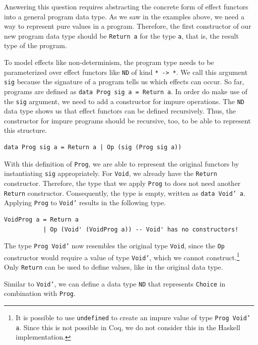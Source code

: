 \documentclass[a4paper, 11pt, fleqn, twoside, abstract=on]{scrreprt}
\newcommand{\hinl}[1]{\texttt{#1}}
\newcommand{\cinl}[1]{\texttt{#1}}
\begin{document}
Answering this question requires abstracting the concrete form of effect functors into a general program data type.
As we saw in the examples above, we need a way to represent pure values in a program.
Therefore, the first constructor of our new program data type should be \hinl{Return a} for the type \hinl{a}, that is, the result type of the program.

To model effects like non-determinism, the program type needs to be parameterized over effect functors like \hinl{ND} of kind \hinl{* -> *}.
We call this argument \hinl{sig} because the signature of a program tells us which effects can occur.
So far, programs are defined as \hinl{data Prog sig a = Return a}.
In order do make use of the \hinl{sig} argument, we need to add a constructor for impure operations.
The \hinl{ND} data type shows us that effect functors can be defined recursively.
Thus, the constructor for impure programs should be recursive, too, to be able to represent this structure.

\begin{verbatim}
data Prog sig a = Return a | Op (sig (Prog sig a))
\end{verbatim}

With this definition of \hinl{Prog}, we are able to represent the original functors by instantiating \hinl{sig} appropriately.
For \hinl{Void}, we already have the \hinl{Return} constructor.
Therefore, the type that we apply \hinl{Prog} to does not need another \hinl{Return} constructor.
Consequently, the type is empty, written as \hinl{data Void' a}.
Applying \cinl{Prog} to \cinl{Void'} results in the following type.

\begin{verbatim}
VoidProg a = Return a
           | Op (Void' (VoidProg a)) -- Void' has no constructors!
\end{verbatim}

The type \hinl{Prog Void'} now resembles the original type \hinl{Void}, since the \hinl{Op} constructor would require a value of type \hinl{Void'}, which we cannot construct.\footnote{It is possible to use \texttt{undefined} to create an impure value of type \texttt{Prog Void' a}.
Since this is not possible in Coq, we do not consider this in the Haskell implementation.}
Only \hinl{Return} can be used to define values, like in the  original data type.

Similar to \hinl{Void'}, we can define a data type \hinl{ND} that represents \hinl{Choice} in combination with \hinl{Prog}.
\end{document}
